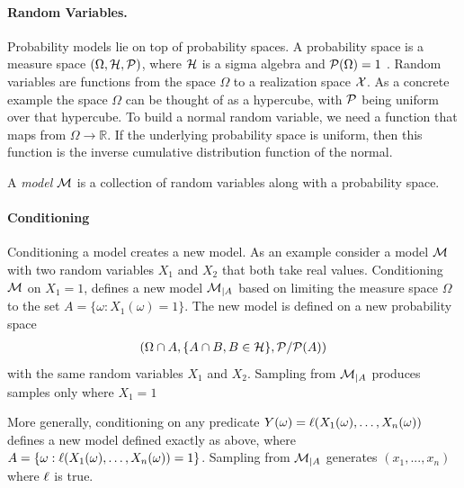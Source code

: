 \paragraph{Random Variables.} Probability models lie on top of probability
spaces. A probability space is a measure space $(\Omega, {\cal H}, {\cal P})$,
where ${\cal H}$ is a sigma algebra and ${\cal P}(\Omega) = 1$ \citep{ccinlar2011probability}. Random variables are
functions from the space $\Omega$ to a realization space ${\cal X}$. As a concrete
example the space $\Omega$ can be thought of as a hypercube, with ${\cal P}$ being
uniform over that hypercube. To build a normal random variable, we need a function
that maps from $\Omega \to \mathbb{R}$. If the underlying probability space is uniform, then
this function is the inverse cumulative distribution function of the normal.

A \emph{model} ${\cal M}$ is a collection of random variables along with a probability space.

\paragraph{Conditioning}

Conditioning a model creates a new model.
As an example consider a model ${\cal M}$ with two
random variables $X_1$ and $X_2$ that both take real values. Conditioning
${\cal M}$ on $X_1 = 1$, defines a new model ${\cal M}_{|A}$ based on limiting the measure space
$\Omega$ to the set $A = \{ \omega : X_1(\omega) = 1\}$.
The new model is defined on a new probability space
\begin{align}
	(\Omega \cap A, \{A \cap B, B \in {\cal H} \}, {\cal P} / {\cal P}(A))
\end{align}
with the same random variables $X_1$ and $X_2$.
Sampling from ${\cal M}_{|A}$ produces
samples only where $X_1 = 1$

More generally, conditioning on any predicate $Y(\omega) = \operatorname{\ell}(X_1(\omega), \dots, X_n(\omega))$
defines a new model defined exactly as above, where $A = \{\omega : \operatorname{\ell}(X_1(\omega), \dots, X_n(\omega)) = 1\}$.
Sampling from ${\cal M}_{|A}$ generates $(x_1, ..., x_n)$ where $\operatorname{\ell}$ is true.

